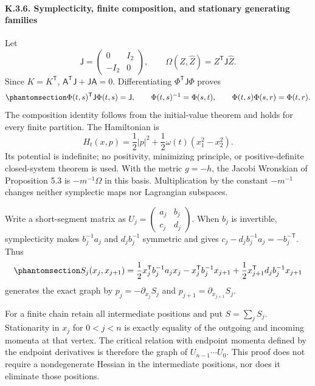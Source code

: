\documentclass[
  english,
  11pt,
  reqno]{amsart}
\begin{document}
\protect{}\label{sec:sh-optics-6}

\paragraph{K.3.6. Symplecticity, finite composition, and stationary
generating
families}\label{k.3.6.-symplecticity-finite-composition-and-stationary-generating-families}

Let \[
 \mathsf J=\begin{pmatrix}0&I_2\\-I_2&0\end{pmatrix},\qquad
 \Omega(Z,\widehat Z)=Z^{\mathsf T}\mathsf J\widehat Z.
\] Since \(K=K^{\mathsf T}\),
\(\mathsf A^{\mathsf T}\mathsf J+\mathsf J\mathsf A=0\). Differentiating
\(\Phi^{\mathsf T}\mathsf J\Phi\) proves
\begin{equation}\protect\phantomsection\label{eq:sh-optics-d-19}{
 \Phi(t,s)^{\mathsf T}\mathsf J\Phi(t,s)=\mathsf J,
 \qquad \Phi(t,s)^{-1}=\Phi(s,t),\qquad
 \Phi(t,s)\Phi(s,r)=\Phi(t,r).
}\end{equation} The composition identity follows from the initial-value
theorem and holds for every finite partition. The Hamiltonian is \[
 H_t(x,p)=\frac12|p|^2+\frac12\omega(t)(x_1^2-x_2^2).
\] Its potential is indefinite; no positivity, minimizing principle, or
positive-definite closed-system theorem is used. With the metric
\(g=-h\), the Jacobi Wronskian of Proposition 5.3 is \(-m^{-1}\Omega\)
in this basis. Multiplication by the constant \(-m^{-1}\) changes
neither symplectic maps nor Lagrangian subspaces.

Write a short-segment matrix as
\(U_j=\begin{pmatrix}a_j&b_j\\c_j&d_j\end{pmatrix}\). When \(b_j\) is
invertible, symplecticity makes \(b_j^{-1}a_j\) and \(d_jb_j^{-1}\)
symmetric and gives \(c_j-d_jb_j^{-1}a_j=-b_j^{-\mathsf T}\). Thus
\begin{equation}\protect\phantomsection\label{eq:sh-optics-d-20}{
 S_j(x_j,x_{j+1})=
 \frac12 x_j^{\mathsf T}b_j^{-1}a_jx_j
 -x_j^{\mathsf T}b_j^{-1}x_{j+1}
 +\frac12x_{j+1}^{\mathsf T}d_jb_j^{-1}x_{j+1}
}\end{equation} generates the exact graph by \(p_j=-\partial_{x_j}S_j\)
and \(p_{j+1}=\partial_{x_{j+1}}S_j\).

For a finite chain retain all intermediate positions and put
\(S=\sum_j S_j\). Stationarity in \(x_j\) for \(0<j<n\) is exactly
equality of the outgoing and incoming momenta at that vertex. The
critical relation with endpoint momenta defined by the endpoint
derivatives is therefore the graph of \(U_{n-1}\cdots U_0\). This proof
does not require a nondegenerate Hessian in the intermediate positions,
nor does it eliminate those positions.
\end{document}

